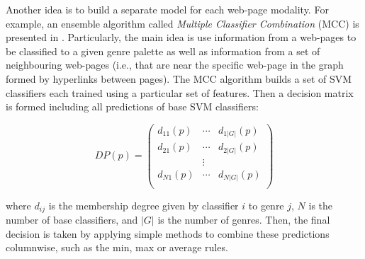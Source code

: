 Another idea is to build a separate model for each web-page modality. For example, an ensemble algorithm called \textit{Multiple Classifier Combination} (MCC) is presented in . Particularly, the main idea is use information from a web-pages to be classified to a given genre palette as well as information from a set of neighbouring web-pages (i.e., that are near the specific web-page in the graph formed by hyperlinks between pages). The MCC algorithm builds a set of SVM classifiers each trained using a particular set of features. Then a decision matrix is formed including all predictions of base SVM classifiers:

\begin{equation}\label{chap:relevant_work:eq:GenreSim_DP}
	DP(p) = \left(
    	\begin{array}{ccc}
        	d_{11} (p) & \cdots & d_{1|G|} (p) \\
            d_{21} (p) & \cdots  & d_{2|G|} (p) \\
            & \vdots & \\
            d_{N1} (p) & \cdots  & d_{N|G|} (p) \\
         \end{array}
\right)
\end{equation}

\noindent
where $d_{ij}$ is the membership degree given by classifier $i$ to genre $j$, $N$ is the number of base classifiers, and $|G|$ is the number of genres. Then, the final decision is taken by applying simple methods to combine these predictions columnwise, such as the min, max or average rules.



